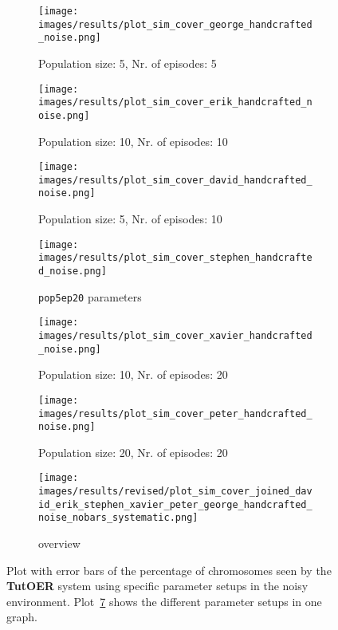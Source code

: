 \begin{figure}[ht]
	\begin{subfigure}{0.48\linewidth}
	\texttt{[image: images/results/plot\_sim\_cover\_george\_handcrafted\_noise.png]}
	\caption{Population size: 5, Nr. of episodes: 5}
	\label{fig:cover_handcrafted_noise_george}
	\end{subfigure}
	\hfill
	\begin{subfigure}{0.48\linewidth}
	\texttt{[image: images/results/plot\_sim\_cover\_erik\_handcrafted\_noise.png]}
	\caption{Population size: 10, Nr. of episodes: 10}
	\label{fig:cover_handcrafted_noise_erik}
	\end{subfigure}
	\begin{subfigure}{0.48\linewidth}
	\texttt{[image: images/results/plot\_sim\_cover\_david\_handcrafted\_noise.png]}
	\caption{Population size: 5, Nr. of episodes: 10}
	\label{fig:cover_handcrafted_noise_david}
	\end{subfigure}
	\hfill
	\begin{subfigure}{0.48\linewidth}
	\texttt{[image: images/results/plot\_sim\_cover\_stephen\_handcrafted\_noise.png]}
	\caption{\texttt{pop5ep20} parameters}
	\label{fig:cover_handcrafted_noise_stephen}
	\end{subfigure}
	\begin{subfigure}{0.48\linewidth}
	\texttt{[image: images/results/plot\_sim\_cover\_xavier\_handcrafted\_noise.png]}
	\caption{Population size: 10, Nr. of episodes: 20}
	\label{fig:cover_handcrafted_noise_xavier}
	\end{subfigure}
	\hfill
	\begin{subfigure}{0.48\linewidth}
	\texttt{[image: images/results/plot\_sim\_cover\_peter\_handcrafted\_noise.png]}
	\caption{Population size: 20, Nr. of episodes: 20}
	\label{fig:cover_handcrafted_noise_peter}
	\end{subfigure}
	\begin{subfigure}{\linewidth}
	\texttt{[image: images/results/revised/plot\_sim\_cover\_joined\_david\_erik\_stephen\_xavier\_peter\_george\_handcrafted\_noise\_nobars\_systematic.png]}
	\caption{overview}
	\label{fig:cover_handcrafted_noise_overview_group1}
	\end{subfigure}
	\caption[Percentage of chromosomes seen in noisy simulated environment for
	group 1]{Plot with error bars of the percentage of chromosomes seen by the \textbf{TutOER}
	system using specific parameter setups in the noisy environment.
	Plot~\ref{fig:cover_handcrafted_noise_overview_group1} shows the
	different parameter setups in one graph.}
	\label{fig:cover_handcrafted_noise_container_group1}
\end{figure}

